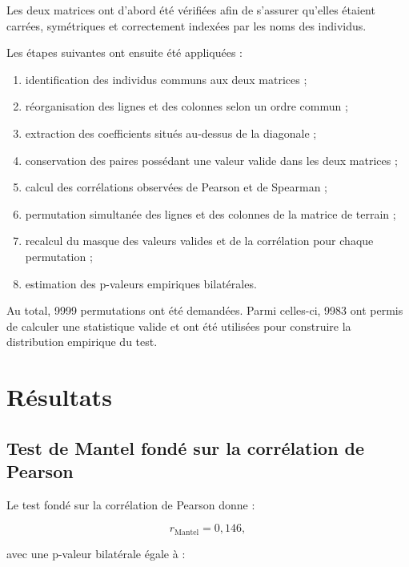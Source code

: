 \documentclass[11pt,a4paper]{report}
\begin{document}
Les deux matrices ont d'abord été vérifiées afin de s'assurer qu'elles
étaient carrées, symétriques et correctement indexées par les noms des
individus.

Les étapes suivantes ont ensuite été appliquées :

\begin{enumerate}
    \item identification des individus communs aux deux matrices ;
    \item réorganisation des lignes et des colonnes selon un ordre
    commun ;
    \item extraction des coefficients situés au-dessus de la diagonale ;
    \item conservation des paires possédant une valeur valide dans les
    deux matrices ;
    \item calcul des corrélations observées de Pearson et de Spearman ;
    \item permutation simultanée des lignes et des colonnes de la
    matrice de terrain ;
    \item recalcul du masque des valeurs valides et de la corrélation
    pour chaque permutation ;
    \item estimation des p-valeurs empiriques bilatérales.
\end{enumerate}

Au total, 9999 permutations ont été demandées. Parmi celles-ci, 9983 ont
permis de calculer une statistique valide et ont été utilisées pour
construire la distribution empirique du test.


\section{Résultats}
\label{sec:resultats_mantel}

\subsection*{Test de Mantel fondé sur la corrélation de Pearson}

Le test fondé sur la corrélation de Pearson donne :

\begin{equation}
    r_{\mathrm{Mantel}}
    =
    0{,}146,
\end{equation}

avec une p-valeur bilatérale égale à :
\end{document}
